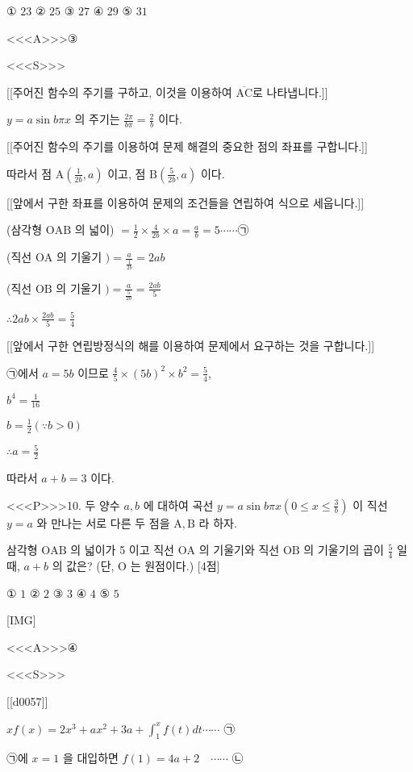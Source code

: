 \documentclass{oblivoir}
\begin{document}
① $23$
② $25$
③ $27$
④ $29$
⑤ $31$

<<<A>>>③

<<<S>>>

[[주어진 함수의 주기를 구하고, 이것을 이용하여 $\overline{\mathrm{AC}}$로 나타냅니다.]]

$y=a \sin b \pi x$ 의 주기는 $\frac{2 \pi}{b \pi}=\frac{2}{b}$ 이다.

[[주어진 함수의 주기를 이용하여 문제 해결의 중요한 점의 좌표를 구합니다.]]

따라서 점 $\mathrm{A}\left(\frac{1}{2 b}, a\right)$ 이고, 점 $\mathrm{B}\left(\frac{5}{2 b}, a\right)$ 이다.

[[앞에서 구한 좌표를 이용하여 문제의 조건들을 연립하여 식으로 세웁니다.]]

(삼각형 $\mathrm{OAB}$ 의 넓이) $=\frac{1}{2} \times \frac{4}{2 b} \times a=\frac{a}{b}=5\cdots\cdots$㉠

(직선 $\mathrm{OA}$ 의 기울기 $)=\frac{a}{\frac{1}{2 b}}=2 a b$

(직선 $\mathrm{OB}$ 의 기울기 $)=\frac{a}{\frac{5}{2 b}}=\frac{2 a b}{5}$

$\therefore 2 a b \times \frac{2 a b}{5}=\frac{5}{4}$

[[앞에서 구한 연립방정식의 해를 이용하여 문제에서 요구하는 것을 구합니다.]]

㉠에서 $a=5 b$ 이므로 $\frac{4}{5} \times(5 b)^{2} \times b^{2}=\frac{5}{4}$,

$b^{4}=\frac{1}{16}$

$b=\frac{1}{2}(\because b>0)$

$\therefore a=\frac{5}{2}$

따라서 $a+b=3$ 이다.


<<<P>>>10. 두 양수 $a, b$ 에 대하여 곡선 $y=a \sin b \pi x\left(0 \leq x \leq \frac{3}{b}\right)$ 이 직선 $y=a$ 와 만나는 서로 다른 두 점을 $\mathrm{A}, \mathrm{B}$ 라 하자.

삼각형 $\mathrm{OAB}$ 의 넓이가 5 이고 직선 $\mathrm{OA}$ 의 기울기와 직선 $\mathrm{OB}$ 의 기울기의 곱이 $\frac{5}{4}$ 일 때, $a+b$ 의 값은? (단, $\mathrm{O}$ 는 원점이다.) [4점]

① $1$
② $2$
③ $3$
④ $4$
⑤ $5$

[IMG]

<<<A>>>④

<<<S>>>

[[d0057]]

$x f(x)=2 x^{3}+a x^{2}+3 a+\int_{1}^{x} f(t) d t \cdots \cdots$ ㉠

㉠에 $x=1$ 을 대입하면 $f(1)=4 a+2 \quad \cdots \cdots$ ㉡
\end{document}
